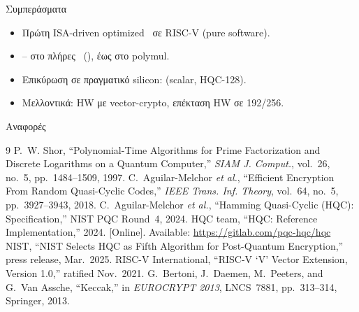 \documentclass[aspectratio=169,10pt]{beamer}
\begin{document}
\begin{frame}{Συμπεράσματα}
  \begin{itemize}
    \item Πρώτη ISA-driven optimized \HQC\ σε RISC-V (pure software).
    \item {}-- στο πλήρες \KEM\ (\instret), έως  στο polymul.
    \item Επικύρωση σε πραγματικό silicon:  (scalar, HQC-128).
    \item Μελλοντικά: HW με vector-crypto, επέκταση HW σε 192/256.
  \end{itemize}
  \vfill
  \centering{}
\end{frame}

\begin{frame}[allowframebreaks]{Αναφορές}
  \begin{thebibliography}{9}
    \footnotesize
     P.~W. Shor, ``Polynomial-Time Algorithms for Prime Factorization and Discrete Logarithms on a Quantum Computer,'' \textit{SIAM J. Comput.}, vol.~26, no.~5, pp.~1484--1509, 1997.
     C.~Aguilar-Melchor \textit{et al.}, ``Efficient Encryption From Random Quasi-Cyclic Codes,'' \textit{IEEE Trans. Inf. Theory}, vol.~64, no.~5, pp.~3927--3943, 2018.
     C.~Aguilar-Melchor \textit{et al.}, ``Hamming Quasi-Cyclic (HQC): Specification,'' NIST PQC Round~4, 2024.
     HQC team, ``HQC: Reference Implementation,'' 2024. [Online]. Available: \url{https://gitlab.com/pqc-hqc/hqc}
     NIST, ``NIST Selects HQC as Fifth Algorithm for Post-Quantum Encryption,'' press release, Mar.~2025.
     RISC-V International, ``RISC-V `V' Vector Extension, Version 1.0,'' ratified Nov.~2021.
     G.~Bertoni, J.~Daemen, M.~Peeters, and G.~Van Assche, ``Keccak,'' in \textit{EUROCRYPT 2013}, LNCS~7881, pp.~313--314, Springer, 2013.
  \end{thebibliography}
\end{frame}

\appendix
\end{document}
